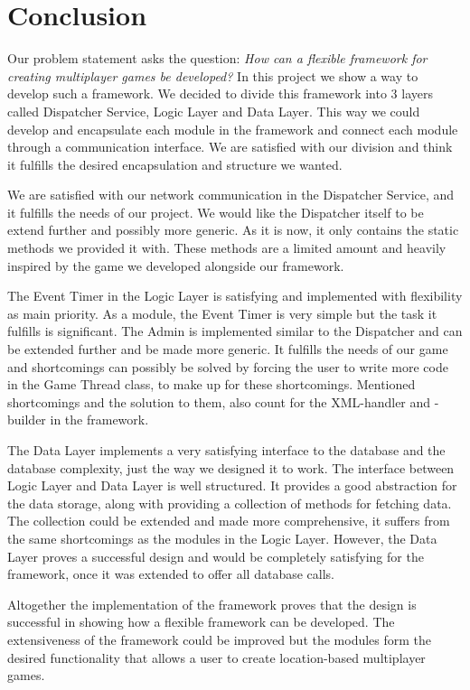 \section{Conclusion}
Our problem statement asks the question: \textit{How can a flexible framework for creating multiplayer games be developed?} In this project we show a way to develop such a framework. We decided to divide this framework into 3 layers called Dispatcher Service, Logic Layer and Data Layer. This way we could develop and encapsulate each module in the framework and connect each module through a communication interface. We are satisfied with our division and think it fulfills the desired encapsulation and structure we wanted. 

We are satisfied with our network communication in the Dispatcher Service, and it fulfills the needs of our project. We would like the Dispatcher itself to be extend further and possibly more generic. As it is now, it only contains the static methods we provided it with. These methods are a limited amount and heavily inspired by the game we developed alongside our framework. 

The Event Timer in the Logic Layer is satisfying and implemented with flexibility as main priority. As a module, the Event Timer is very simple but the task it fulfills is significant. The Admin is implemented similar to the Dispatcher and can be extended further and be made more generic. It fulfills the needs of our game and shortcomings can possibly be solved by forcing the user to write more code in the Game Thread class, to make up for these shortcomings. Mentioned shortcomings and the solution to them, also count for the XML-handler and -builder in the framework.

The Data Layer implements a very satisfying interface to the database and the database complexity, just the way we designed it to work. The interface between Logic Layer and Data Layer is well structured. It provides a good abstraction for the data storage, along with providing a collection of methods for fetching data. The collection could be extended and made more comprehensive, it suffers from the same shortcomings as the modules in the Logic Layer. However, the Data Layer proves a successful design and would be completely satisfying for the framework, once it was extended to offer all database calls. 

Altogether the implementation of the framework proves that the design is successful in showing how a flexible framework can be developed. The extensiveness of the framework could be improved but the modules form the desired functionality that allows a user to create location-based multiplayer games. 
